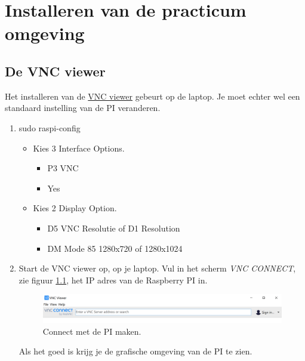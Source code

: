 \chapter{Installeren van de practicum omgeving} \label{app:instal}


\section{De VNC viewer}
\label{sec:vnc}
Het installeren van de \href{https://www.realvnc.com/en/connect/download/viewer/}{VNC viewer} gebeurt op de laptop. Je moet echter wel een standaard instelling van de PI veranderen.
\begin{enumerate}
	\item sudo raspi-config
	\begin{itemize}
		\item Kies 3 Interface Options.
			\begin{itemize}
		\item P3 VNC
		 \item Yes
		 \end{itemize}
	 \item 	Kies 2 Display Option.		
	 	\begin{itemize}
	 	  \item D5 VNC Resolutie of D1 Resolution
	 	  \item DM Mode 85 1280x720 of 1280x1024
	     \end{itemize}
	\end{itemize}
\item Start de VNC viewer op, op je laptop. Vul in het scherm \textit{VNC CONNECT}, zie figuur \ref{fig:winvnc}, het IP adres van de Raspberry PI in.
	\begin{figure}[h!]
	\captionsetup{justification=centering}
	\includegraphics[width=0.7 \linewidth]{figuren/vncopstart}
	\centering
	\caption{Connect met de PI  maken.}
	\label{fig:winvnc}
\end{figure}
Als het goed is krijg je de grafische omgeving van de PI te zien.

\end{enumerate}

